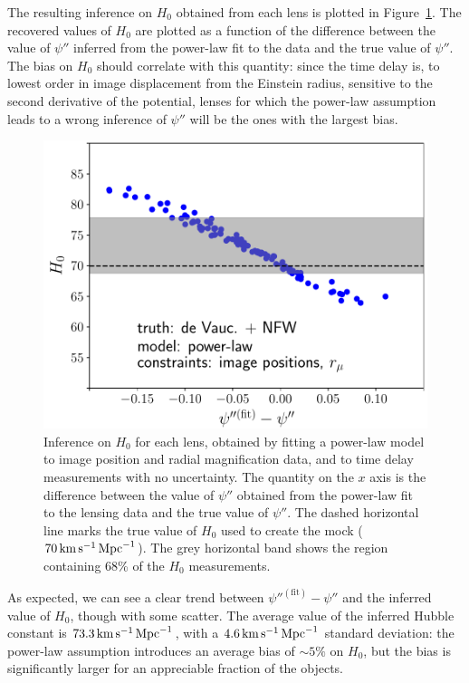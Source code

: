 \documentclass[usenatbib]{mnras}
\def\psiii{\psi''}
\def\Hunit{\,\rm{km}\,{s}^{-1}\,\rm{Mpc}^{-1}}
\def\Fref#1{Figure~\ref{#1}\xspace}
\begin{document}
The resulting inference on $H_0$ obtained from each lens is plotted in \Fref{fig:plH0}.
The recovered values of $H_0$ are plotted as a function of the difference between the value of $\psiii$ inferred from the power-law fit to the data and the true value of $\psiii$.
The bias on $H_0$ should correlate with this quantity: since the time delay is, to lowest order in image displacement from the Einstein radius, sensitive to the second derivative of the potential, lenses for which the power-law assumption leads to a wrong inference of $\psiii$ will be the ones with the largest bias.
%
\begin{figure}
 \includegraphics[width=\columnwidth]{individual_H0.pdf}
 \caption{Inference on $H_0$ for each lens, obtained by fitting a power-law model to image position and radial magnification data, and to time delay measurements with no uncertainty.
The quantity on the $x$ axis is the difference between the value of $\psi''$ obtained from the power-law fit to the lensing data and the true value of $\psi''$.
The dashed horizontal line marks the true value of $H_0$ used to create the mock ($70\,\rm{km}\,\rm{s}^{-1}\,\rm{Mpc}^{-1}$).
The grey horizontal band shows the region containing 68\% of the $H_0$ measurements.
}
 \label{fig:plH0}
\end{figure}
%
As expected, we can see a clear trend between $\psi''^{\mathrm{(fit)}} - \psiii$ and the inferred value of $H_0$, though with some scatter.
The average value of the inferred Hubble constant is $73.3\Hunit$, with a $4.6\Hunit$ standard deviation: the power-law assumption introduces an average bias of $\sim5\%$ on $H_0$, but the bias is significantly larger for an appreciable fraction of the objects.
\end{document}
